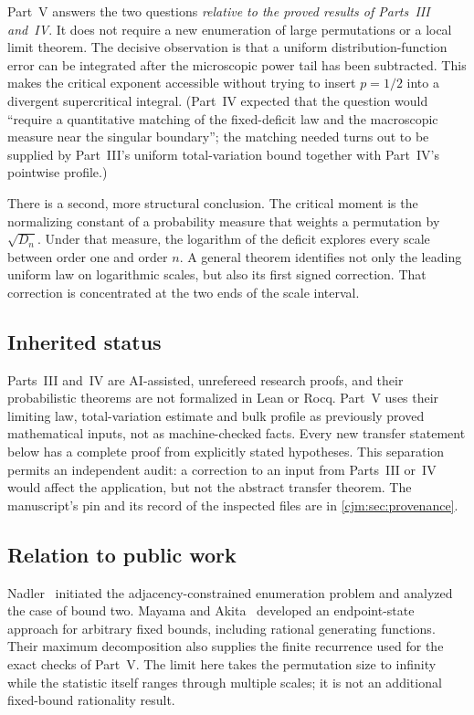 \documentclass[11pt,a4paper]{article}
\theoremstyle{definition}\newaliascnt{definition}{theorem}
\theoremstyle{remark}\newaliascnt{remark}{theorem}
\begin{document}
Part~V answers the two questions \emph{relative to the proved results of
Parts~III and~IV}. It does not require a new enumeration of large
permutations or a local limit theorem. The decisive observation is that a
uniform distribution-function error can be integrated after the microscopic
power tail has been subtracted. This makes the critical exponent accessible
without trying to insert $p=1/2$ into a divergent supercritical integral.
(Part~IV expected that the question would ``require a quantitative matching
of the fixed-deficit law and the macroscopic measure near the singular
boundary''; the matching needed turns out to be supplied by Part~III's uniform
total-variation bound together with Part~IV's pointwise profile.)

There is a second, more structural conclusion. The critical moment is the
normalizing constant of a probability measure that weights a permutation by
$\sqrt{D_n}$. Under that measure, the logarithm of the deficit explores every
scale between order one and order $n$. A general theorem identifies not
only the leading uniform law on logarithmic scales, but also its first
signed correction. That correction is concentrated at the two ends of the
scale interval.

\subsection{Inherited status}
Parts~III and~IV are AI-assisted, unrefereed research proofs, and their
probabilistic theorems are not formalized in Lean or Rocq. Part~V uses their
limiting law, total-variation estimate and bulk profile as previously proved
mathematical inputs, not as machine-checked facts. Every new transfer
statement below has a complete proof from explicitly stated hypotheses. This
separation permits an independent audit: a correction to an input from
Parts~III or~IV would affect the application, but not the abstract transfer
theorem. The manuscript's pin and its record of the inspected files are in
\cref{cjm:sec:provenance}.

\subsection{Relation to public work}
Nadler~\cite{Nadler} initiated the adjacency-constrained enumeration problem
and analyzed the case of bound two. Mayama and Akita~\cite{MayamaAkita}
developed an endpoint-state approach for arbitrary fixed bounds, including
rational generating functions. Their maximum decomposition also supplies
the finite recurrence used for the exact checks of Part~V. The limit here
takes the permutation size to infinity while the statistic itself ranges
through multiple scales; it is not an additional fixed-bound rationality
result.
\end{document}
